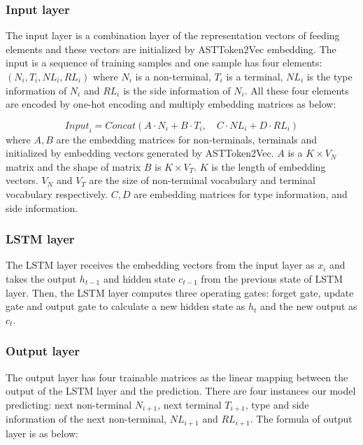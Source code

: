 \documentclass[E]{compsoft}
\begin{document}
\subsubsection{Input layer}
The input layer is a combination layer of the representation vectors of feeding elements and these vectors are initialized by ASTToken2Vec embedding.
The input is a sequence of training samples and one sample has four elements: $(N_{i}, T_{i}, NL_{i}, RL_{i})$ where $N_{i}$ is a non-terminal, $T_{i}$ is a terminal, $NL_{i}$ is the type information of $N_{i}$ and $RL_{i}$ is the side information of $N_{i}$. All these four elements are encoded by one-hot encoding and multiply embedding matrices as below:

\begin{equation}
\mathit{Input}_{i} = \mathit{Concat}(A\cdot N_{i} + B\cdot T_{i}, \quad C\cdot NL_{i} + D\cdot RL_{i})\label{equ:input}
\end{equation}
where $A, B$ are the embedding matrices for non-terminals, terminals and initialized by embedding vectors generated by ASTToken2Vec. $A$ is a $K \times V_{N} $ matrix and the shape of matrix $B$ is $K \times V_{T}$. $K$ is the length of embedding vectors. 
$V_{N}$ and $V_{T}$ are the size of non-terminal vocabulary and terminal vocabulary respectively. 
$C, D$ are embedding matrices for type information, and side information.


\subsubsection{LSTM layer}
The LSTM layer receives the embedding vectors from the input layer as $x_{i}$ and takes the output $h_{t-1}$ and hidden state $c_{t-1}$ from the previous state of LSTM layer. 
Then, the LSTM layer computes three operating gates: forget gate, update gate and output gate to calculate a new hidden state as $h_{t}$ and the new output as $c_{t}$.



\subsubsection{Output layer}
The output layer has four trainable matrices as the linear mapping between the output of the LSTM layer and the prediction. 
There are four instances our model predicting: 
next non-terminal $N_{i+1}$, next terminal $T_{i+1}$, type and side information of the next non-terminal, $NL_{i+1}$ and $RL_{i+1}$. 
The formula of output layer is as below:
\end{document}
